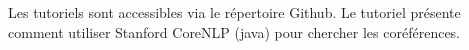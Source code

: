 \documentclass{KodeBook}
\begin{document}
Les tutoriels sont accessibles via le répertoire Github.
Le tutoriel présente comment utiliser Stanford CoreNLP (java) pour chercher les coréférences.



\ifx\wholebook\relax\else
% 
% 
	
\end{document}
